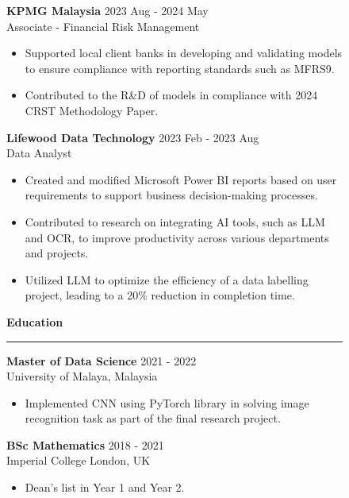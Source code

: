 \documentclass[a4paper, 10pt]{article}
\newcommand{\rhsWidth}{0.65\textwidth}
\newenvironment{expSection}[3]{%
    \textbf{#1} \hfill {#2} \\
    #3
	\vspace{-6pt}
}{}
\begin{document}
\begin{figure}[h]
\begin{minipage}[t]{\rhsWidth}
	\begin{expSection} {KPMG Malaysia} {2023 Aug - 2024 May} {Associate - Financial Risk Management}
		\begin{itemize} [itemsep = 0pt, parsep=2pt]
			\item Supported local client banks in developing and validating models to ensure compliance with reporting standards such as MFRS9.
			\item Contributed to the R\&D of models in compliance with 2024 CRST Methodology Paper.
		\end{itemize}
	\end{expSection}

	\begin{expSection} {Lifewood Data Technology} {2023 Feb - 2023 Aug} {Data Analyst}
		\begin{itemize} [itemsep = 0pt, parsep=2pt]
			\item Created and modified Microsoft Power BI reports based on user requirements to support business decision-making processes.
			\item Contributed to research on integrating AI tools, such as LLM and OCR, to improve productivity across various departments and projects.
			\item Utilized LLM to optimize the efficiency of a data labelling project, leading to a 20\% reduction in completion time.
		\end{itemize}
	\end{expSection}

	\vspace{1.0em}
	
	{\Large \faGraduationCap \hspace{3pt} \textbf{Education}} \newline
	\rule [6pt]{\linewidth}{1pt}
	\vspace{-15pt}
	
	\begin{expSection} {Master of Data Science} {2021 - 2022} {University of Malaya, Malaysia}
		\begin{itemize} [itemsep = 0pt, parsep=2pt]
			\item Implemented CNN using PyTorch library in solving image recognition task as part of the final research project.
		\end{itemize}
	\end{expSection}
	
	\begin{expSection} {BSc Mathematics} {2018 - 2021} {Imperial College London, UK}
		\begin{itemize} [itemsep = 0pt, parsep=2pt]
			\item Dean's list in Year 1 and Year 2.
		\end{itemize}
	\end{expSection}
	

\end{minipage}
\end{figure}
\end{document}
